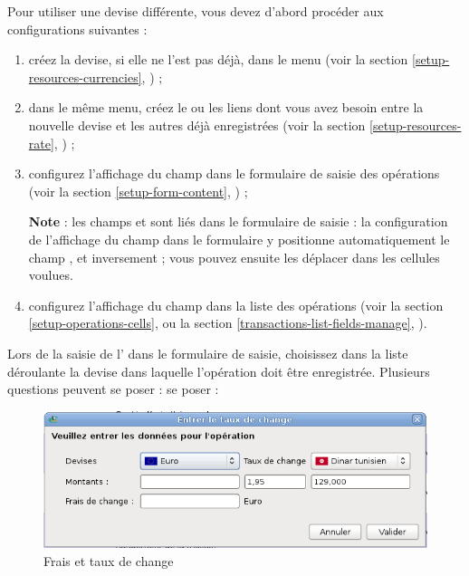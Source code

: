 Pour utiliser une devise différente, vous devez d'abord procéder aux configurations suivantes :
\begin{enumerate}
	 \item créez la devise, si elle ne l'est pas déjà, dans le menu  (voir la section \vref{setup-resources-currencies}, ) ;
	 \item dans le même menu, créez le ou les liens dont vous avez besoin entre la nouvelle devise et les autres déjà enregistrées (voir la section \vref{setup-resources-rate}, ) ;
	 \item configurez l'affichage du champ  dans le formulaire de saisie des opérations (voir la section \vref{setup-form-content}, ) ;
	 
	 \textbf{Note} : les champs  et  sont liés dans le formulaire de saisie : la configuration de l'affichage du champ  dans le formulaire y positionne automatiquement le champ , et inversement ; vous pouvez ensuite les déplacer dans les cellules voulues.
	 \item configurez l'affichage du champ  dans la liste des opérations (voir la section \vref{setup-operations-cells},  ou la section \vref{transactions-list-fields-manage}, ).
\end{enumerate}

Lors de la saisie de l' dans le formulaire de saisie, choisissez dans la liste déroulante la devise dans laquelle l'opération doit être enregistrée. Plusieurs questions peuvent \ifIllustration se poser :
\else se poser :
\fi

\ifIllustration
\begin{figure}[htbp]
\begin{center}
\includegraphics[scale=0.5]{image/screenshot/transactions_changeRate}
\end{center}
\caption{Frais et taux de change}
\label{transactions-changeRate-img}
\end{figure}
\fi

